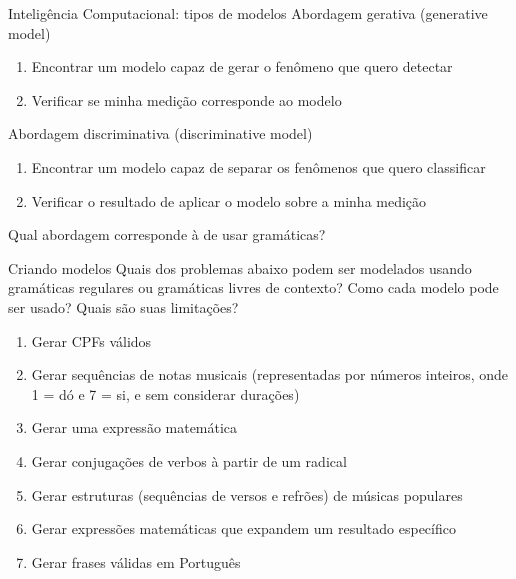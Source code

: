 \documentclass{beamer}
\begin{document}
\begin{frame}{Inteligência Computacional: tipos de modelos}
  \large
  Abordagem gerativa (generative model)
  \begin{enumerate}
    \item Encontrar um modelo capaz de gerar o fenômeno que quero detectar
    \item Verificar se minha medição corresponde ao modelo
  \end{enumerate}

  Abordagem discriminativa (discriminative model)
  \begin{enumerate}
    \item Encontrar um modelo capaz de separar os fenômenos que quero
      classificar
    \item Verificar o resultado de aplicar o modelo sobre a minha medição
  \end{enumerate}

  Qual abordagem corresponde à de usar gramáticas?
\end{frame}

\begin{frame}{Criando modelos}
\large
  Quais dos problemas abaixo podem ser modelados usando gramáticas regulares ou
  gramáticas livres de contexto? Como cada modelo pode ser usado? Quais são suas
  limitações?
  \begin{enumerate}
    \item Gerar CPFs válidos
    \item Gerar sequências de notas musicais (representadas por números
      inteiros, onde 1 = dó e 7 = si, e sem considerar durações)
    \item Gerar uma expressão matemática
    \item Gerar conjugações de verbos à partir de um radical
    \item Gerar estruturas (sequências de versos e refrões) de músicas
      populares
    \item Gerar expressões matemáticas que expandem um resultado específico
    \item Gerar frases válidas em Português
  \end{enumerate}
\end{frame}
\end{document}

